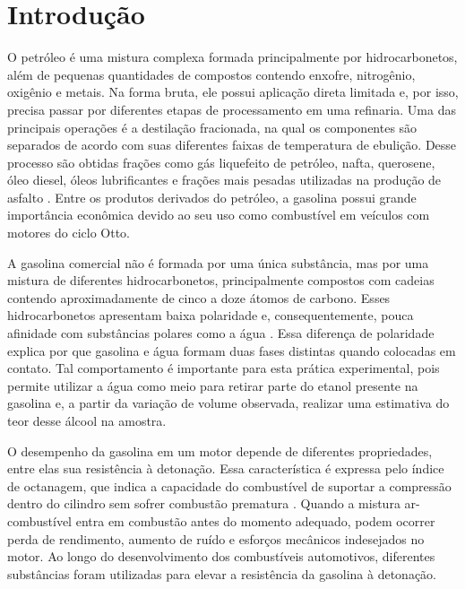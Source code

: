 \documentclass[11pt]{ifscarticle}
\begin{document}
\tableofcontents
\clearpage
\onehalfspacing

\section{Introdução}

O petróleo é uma mistura complexa formada principalmente por hidrocarbonetos, além de pequenas quantidades de compostos contendo enxofre, nitrogênio, oxigênio e metais. Na forma bruta, ele possui aplicação direta limitada e, por isso, precisa passar por diferentes etapas de processamento em uma refinaria. Uma das principais operações é a destilação fracionada, na qual os componentes são separados de acordo com suas diferentes faixas de temperatura de ebulição. Desse processo são obtidas frações como gás liquefeito de petróleo, nafta, querosene, óleo diesel, óleos lubrificantes e frações mais pesadas utilizadas na produção de asfalto \cite{thomas2004}. Entre os produtos derivados do petróleo, a gasolina possui grande importância econômica devido ao seu uso como combustível em veículos com motores do ciclo Otto.

A gasolina comercial não é formada por uma única substância, mas por uma mistura de diferentes hidrocarbonetos, principalmente compostos com cadeias contendo aproximadamente de cinco a doze átomos de carbono. Esses hidrocarbonetos apresentam baixa polaridade e, consequentemente, pouca afinidade com substâncias polares como a água \cite{solomons2012,atkins2012}. Essa diferença de polaridade explica por que gasolina e água formam duas fases distintas quando colocadas em contato. Tal comportamento é importante para esta prática experimental, pois permite utilizar a água como meio para retirar parte do etanol presente na gasolina e, a partir da variação de volume observada, realizar uma estimativa do teor desse álcool na amostra.

O desempenho da gasolina em um motor depende de diferentes propriedades, entre elas sua resistência à detonação. Essa característica é expressa pelo índice de octanagem, que indica a capacidade do combustível de suportar a compressão dentro do cilindro sem sofrer combustão prematura \cite{brown2016}. Quando a mistura ar-combustível entra em combustão antes do momento adequado, podem ocorrer perda de rendimento, aumento de ruído e esforços mecânicos indesejados no motor. Ao longo do desenvolvimento dos combustíveis automotivos, diferentes substâncias foram utilizadas para elevar a resistência da gasolina à detonação.
\end{document}
